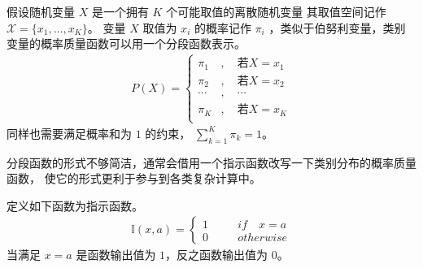 \documentclass[letterpaper,10pt,english]{sphinxmanual}
\begin{document}
假设随机变量 \(X\) 是一个拥有 \(K\) 个可能取值的离散随机变量
其取值空间记作 \(\mathcal{X}=\{x_1,\dots,x_K\}\)。
变量 \(X\) 取值为 \(x_i\) 的概率记作 \(\pi_i\)
，类似于伯努利变量，类别变量的概率质量函数可以用一个分段函数表示。
\begin{equation}\label{equation:概率基础/content:eq_probability_031}
\begin{split}P(X) = \left \{
    \begin{aligned}
    \pi_1 &, \quad \text{若}X=x_1 \\
    \pi_2 &, \quad \text{若}X=x_2 \\
    \cdots &,\quad \cdots \\
    \pi_K &, \quad \text{若}X=x_K \\
    \end{aligned}
    \right.\end{split}
\end{equation}
同样也需要满足概率和为 \(1\) 的约束， \(\sum_{k=1}^K \pi_k = 1\)。

分段函数的形式不够简洁，通常会借用一个指示函数改写一下类别分布的概率质量函数，
使它的形式更利于参与到各类复杂计算中。

\begin{sphinxShadowBox}

定义如下函数为指示函数。
\begin{equation}\label{equation:概率基础/content:概率基础/content:61}
\begin{split}\mathbb{I}(x,a)=\left\{
\begin{aligned}
1 & \quad &if \quad x = a \\
0 & \quad &otherwise
\end{aligned}
\right.\end{split}
\end{equation}
当满足 \(x=a\) 是函数输出值为 \(1\)，反之函数输出值为 \(0\)。
\end{sphinxShadowBox}
\end{document}
